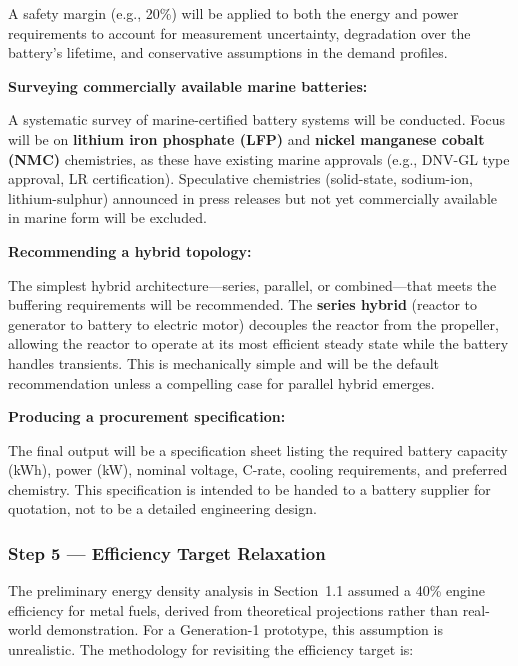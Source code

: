 \documentclass[12pt]{article}
\begin{document}
A safety margin (e.g., 20\%) will be applied to both the energy and power requirements to account for measurement uncertainty, degradation over the battery's lifetime, and conservative assumptions in the demand profiles.

\textbf{Surveying commercially available marine batteries:}

A systematic survey of marine-certified battery systems will be conducted. Focus will be on \textbf{lithium iron phosphate (LFP)} and \textbf{nickel manganese cobalt (NMC)} chemistries, as these have existing marine approvals (e.g., DNV-GL type approval, LR certification). Speculative chemistries (solid-state, sodium-ion, lithium-sulphur) announced in press releases but not yet commercially available in marine form will be excluded.

\textbf{Recommending a hybrid topology:}

The simplest hybrid architecture—series, parallel, or combined—that meets the buffering requirements will be recommended. The \textbf{series hybrid} (reactor to generator to battery to electric motor) decouples the reactor from the propeller, allowing the reactor to operate at its most efficient steady state while the battery handles transients. This is mechanically simple and will be the default recommendation unless a compelling case for parallel hybrid emerges.

\textbf{Producing a procurement specification:}

The final output will be a specification sheet listing the required battery capacity (kWh), power (kW), nominal voltage, C-rate, cooling requirements, and preferred chemistry. This specification is intended to be handed to a battery supplier for quotation, not to be a detailed engineering design.

\subsubsection*{Step 5 — Efficiency Target Relaxation}

The preliminary energy density analysis in Section~1.1 assumed a 40\% engine efficiency for metal fuels, derived from theoretical projections rather than real-world demonstration. For a Generation-1 prototype, this assumption is unrealistic. The methodology for revisiting the efficiency target is:
\end{document}
